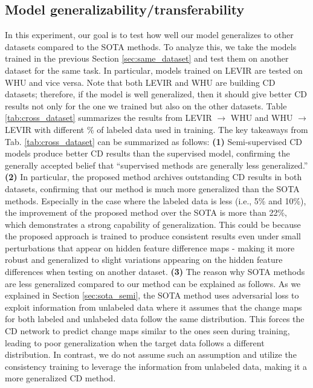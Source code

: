 \documentclass[runningheads]{llncs}
\begin{document}
\vspace{-4mm}
\subsection{Model generalizability/transferability}
\label{sec:cross_dataset}
In this experiment, our goal is to test how well our model generalizes to other datasets compared to the SOTA methods. To analyze this, we take the models trained in the previous Section \ref{sec:same_dataset} and test them on another dataset for the same task. In particular, models trained on LEVIR are tested on WHU and vice versa. Note that both LEVIR and WHU are building CD datasets; therefore, if the model is well generalized, then it should give better CD results not only for the one we trained but also on the other datasets. Table \ref{tab:cross_dataset} summarizes the results from LEVIR $\rightarrow$ WHU and WHU $\rightarrow$ LEVIR with different \% of labeled data used in training. The key takeaways from Tab. \ref{tab:cross_dataset} can be summarized as follows: \textbf{(1) } Semi-supervised CD models produce better CD results than the supervised model, confirming the generally accepted belief that ``supervised methods are generally less generalized.'' \textbf{(2)} In particular, the proposed method archives outstanding CD results in both datasets, confirming that our method is much more generalized than the SOTA methods. Especially in the case where the labeled data is less  (i.e., 5\% and 10\%), the improvement of the proposed method over the SOTA is more than 22\%, which demonstrates a strong capability of generalization. This could be because the proposed approach is trained to produce consistent results even under small perturbations that appear on hidden feature difference maps - making it more robust and generalized to slight variations appearing on the hidden feature differences when testing on another dataset. \textbf{(3)} The reason why SOTA methods are less generalized compared to our method can be explained as follows. As we explained in Section \ref{sec:sota_semi}, the SOTA method uses adversarial loss to exploit information from unlabeled data where it assumes that the change maps for both labeled and unlabeled data follow the same distribution.  This forces the CD network to predict change maps similar to the ones seen during training, leading to poor generalization when the target data follows a different distribution. In contrast, we do not assume such an assumption and utilize the consistency training to leverage the information from unlabeled data, making it a more generalized CD method.
\end{document}
